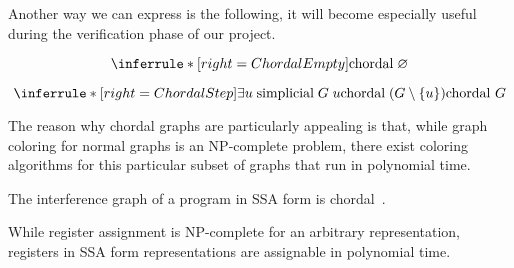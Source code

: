 Another way we can express  is the following, it will become especially useful during the verification phase of our project.

\[
\inferrule*[right=ChordalEmpty]{
}{
    \text{chordal} \; \varnothing
}
\]

\[
\inferrule*[right=ChordalStep]{
    \exists u \; \text{simplicial} \; G \; u \\
    \text{chordal} \; (G \setminus \{ u \})
}{
    \text{chordal } G
}
\]

The reason why chordal graphs are particularly appealing is that, while graph coloring for normal graphs is an NP-complete problem, there exist coloring algorithms for this particular subset of graphs that run in polynomial time.

\begin{theorem}[Chordality]
    The interference graph of a program in SSA form is chordal~\cite{...}.
\end{theorem}


While register assignment is NP-complete for an arbitrary representation, registers in SSA form representations are assignable in polynomial time.